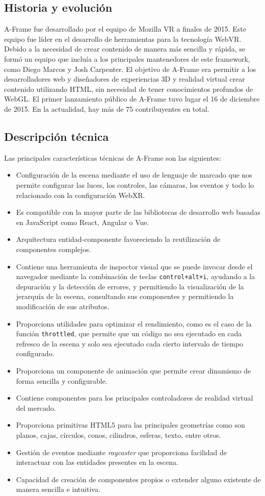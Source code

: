 \documentclass[a4paper, 11pt]{book}
\begin{document}
\subsection{Historia y evolución}
A-Frame fue desarrollado por el equipo de Mozilla VR a finales de 2015. Este equipo fue líder en el desarrollo de herramientas para la tecnología WebVR. Debido a la necesidad de crear contenido de manera más sencilla y rápida, se formó un equipo que incluía a los principales mantenedores de este framework, como Diego Marcos y Josh Carpenter. El objetivo de A-Frame era permitir a los desarrolladores web y diseñadores de experiencias 3D y realidad virtual crear contenido utilizando HTML, sin necesidad de tener conocimientos profundos de WebGL. El primer lanzamiento público de A-Frame tuvo lugar el 16 de diciembre de 2015. En la actualidad, hay más de 75 contribuyentes en total.
\subsection{Descripción técnica}
Las principales características técnicas de A-Frame son las siguientes:

\begin{itemize}
    \item Configuración de la escena mediante el uso de lenguaje de marcado que nos permite configurar las luces, los controles, las cámaras, los eventos y todo lo relacionado con la configuración WebXR.
    \item Es compatible con la mayor parte de las bibliotecas de desarrollo web basadas en JavaScript como React, Angular o Vue.
    \item Arquitectura entidad-componente favoreciendo la reutilización de componentes complejos.
    \item Contiene una herramienta de inspector visual que se puede invocar desde el navegador mediante la combinación de teclas \texttt{control+alt+i}, ayudando a la depuración y la detección de errores, y permitiendo la visualización de la jerarquía de la escena, consultando sus componentes y permitiendo la modificación de sus atributos.
    \item Proporciona utilidades para optimizar el rendimiento, como es el caso de la función \texttt{throttled}, que permite que un código no sea ejecutado en cada refresco de la escena y solo sea ejecutado cada cierto intervalo de tiempo configurado.
    \item Proporciona un componente de animación que permite crear dinamismo de forma sencilla y configurable.
    \item Contiene componentes para los principales controladores de realidad virtual del mercado.
    \item Proporciona primitivas HTML5 para las principales geometrías como son planos, cajas, círculos, conos, cilindros, esferas, texto, entre otros.
    \item Gestión de eventos mediante \textit{raycaster} que proporciona facilidad de interactuar con las entidades presentes en la escena.
    \item Capacidad de creación de componentes propios o extender alguno existente de manera sencilla e intuitiva.
\end{itemize}
\end{document}
